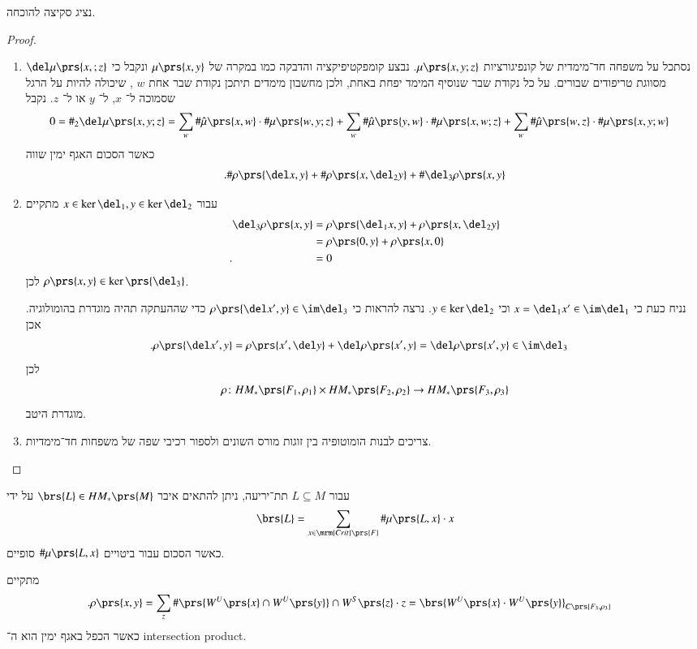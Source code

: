 \documentclass[a4paper,10pt,twoside,openany]{book}
\begin{document}
נציג סקיצה להוכחה.

\begin{proof}
\begin{enumerate}
\item נסתכל על משפחה חד־מימדית של קונפיגורציות
$\mu\prs{x,y;z}$.
נבצע קומפקטיפיקציה והדבקה כמו במקרה של
$\mu\prs{x,y}$
ונקבל כי
$\del \mu\prs{x,;z}$
מסווגת טריפודים שבורים.
על כל נקודת שבר שנוסיף המימד יפחת באחת, ולכן מחשבון מימדים תיתכן נקודת שבר אחת
$w$%
, שיכולה להיות על הרגל שסמוכה ל־%
$x$,
ל־%
$y$
או ל־%
$z$.
נקבל
\begin{align*}
0 = \#_2 \del \mu\prs{x,y;z} &= \sum_w \# \hat{\mu}\prs{x,w} \cdot \#\mu\prs{w,y;z} + \sum_w \# \hat{\mu}\prs{y,w} \cdot \# \mu\prs{x,w;z} + \sum_w \# \hat{\mu}\prs{w,z} \cdot \#\mu\prs{x,y;w}
\end{align*}
כאשר הסכום האגף ימין שווה
\[\text{.} \# \rho\prs{\del x, y} + \# \rho\prs{x,\del_2 y} + \# \del_3\rho\prs{x,y}\]

\item עבור
$x \in \ker \del_1, y \in \ker \del_2$
מתקיים
\begin{align*}
\del_3 \rho\prs{x,y} &= \rho\prs{\del_1 x, y} + \rho\prs{x, \del_2 y}
\\&= \rho\prs{0,y} + \rho\prs{x,0}
\\ \text{.} \hphantom{\del_3 \rho\prs{x,y}} &= 0
\end{align*}
לכן
$\rho\prs{x,y} \in \ker\prs{\del_3}$.

נניח כעת כי
$x = \del_1 x' \in \im \del_1$
וכי
$y \in \ker \del_2$.
נרצה להראות כי
$\rho\prs{\del x', y} \in \im \del_3$
כדי שההעתקה תהיה מוגדרת בהומולוגיה. אכן
\begin{align*}
\text{.} \rho\prs{\del x', y} &= \rho\prs{x', \del y} + \del \rho\prs{x', y}
= \del \rho\prs{x', y} \in \im \del_3
\end{align*}
לכן
\[\rho \colon HM_*\prs{F_1, \rho_1} \times HM_*\prs{F_2, \rho_2} \to HM_*\prs{F_3, \rho_3}\]
מוגדרת היטב.

\item צריכים לבנות הומוטופיה בין זוגות מורס השונים ולספור רכיבי שפה של משפחות חד־מימדיות.
\end{enumerate}
\end{proof}

\begin{remark}
עבור
$L \subseteq M$
תת־יריעה, ניתן להתאים איבר
$\brs{L} \in HM_*\prs{M}$
על ידי
\[\brs{L} = \sum_{x \in \mrm{Crit}\prs{F}} \# \mu\prs{L,x} \cdot x\]
כאשר הסכום עבור ביטויים
$\# \mu\prs{L,x}$
סופיים.

מתקיים
\begin{align*}
\text{.} \rho\prs{x,y} &= \sum_z \#\prs{W^U\prs{x} \cap W^U\prs{y}} \cap W^S\prs{z} \cdot z
= \brs{W^U\prs{x} \cdot W^U\prs{y}}_{C\prs{F_3, \rho_3}}
\end{align*}
כאשר הכפל באגף ימין הוא ה־%
\textenglish{intersection product}.
\end{remark}
\end{document}
